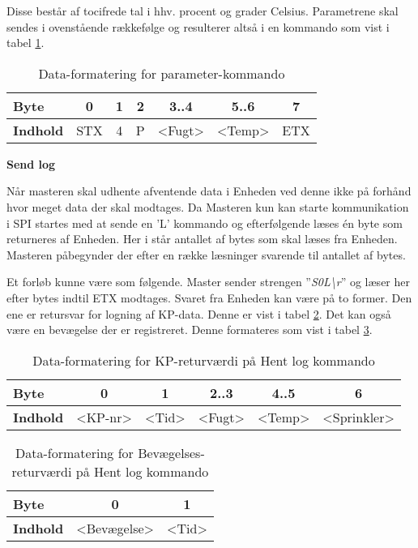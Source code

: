 Disse består af tocifrede tal i hhv. procent og grader Celsius. 
Parametrene skal sendes i ovenstående rækkefølge og resulterer altså i en kommando som vist i tabel \ref{table:SWProtokol-para}.

\begin{table}[h]
	\caption{Data-formatering for parameter-kommando}
	\centering
	\begin{tabular}{|l|c|c|c|c|c|c|}
		\hline 
		\textbf{Byte} & 0 & 1 & 2 & 3..4 & 5..6 & 7 \\ 
		\hline 
		\textbf{Indhold} & STX & 4 & P & <Fugt> & <Temp> & ETX \\ 
		\hline 
	\end{tabular} 
	\label{table:SWProtokol-para}
\end{table}

\textbf{Send log}

Når masteren skal udhente afventende data i Enheden ved denne ikke på forhånd hvor meget data der skal modtages. Da Masteren kun kan starte kommunikation i SPI startes med at sende en 'L' kommando og efterfølgende læses én byte som returneres af Enheden. Her i står antallet af bytes som skal læses fra Enheden. Masteren påbegynder der efter en række læsninger svarende til antallet af bytes.

Et forløb kunne være som følgende.
Master sender strengen ''\textit{S0L\textbackslash r}'' og læser her efter bytes indtil ETX modtages.
Svaret fra Enheden kan være på to former. Den ene er retursvar for logning af KP-data. Denne er vist i tabel \ref{table:SWProtokol-log-kp}. Det kan også være en bevægelse der er registreret. Denne formateres som vist i tabel  \ref{table:SWProtokol-log-bev}.

\begin{table}[h]
	\caption{Data-formatering for KP-returværdi på Hent log kommando}
	\centering
	\begin{tabular}{|l|c|c|c|c|c|}
		\hline 
		\textbf{Byte} & 0 & 1 & 2..3 & 4..5 & 6 \\ 
		\hline 
		\textbf{Indhold} & <KP-nr> & <Tid> & <Fugt> & <Temp> & <Sprinkler> \\ 
		\hline 
	\end{tabular} 
	\label{table:SWProtokol-log-kp}
\end{table}

\begin{table}[h]
	\caption{Data-formatering for Bevægelses-returværdi på Hent log kommando}
	\centering
	\begin{tabular}{|l|c|c|}
		\hline 
		\textbf{Byte} & 0 & 1\\ 
		\hline 
		\textbf{Indhold} & <Bevægelse> & <Tid> \\ 
		\hline 
	\end{tabular} 
	\label{table:SWProtokol-log-bev}
\end{table}